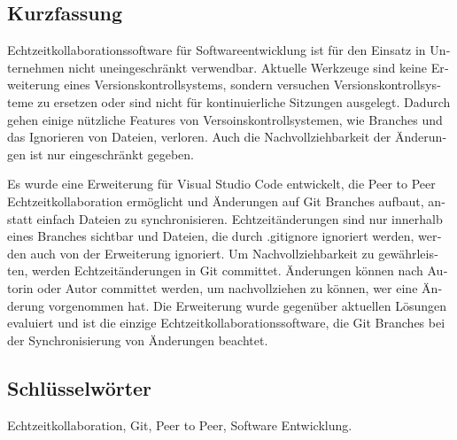 
\cleardoublepage
{}




\begin{otherlanguage}{ngerman}

  \chapter*{Kurzfassung}

  Echtzeitkollaborationssoftware für Softwareentwicklung ist für den Einsatz in Unternehmen nicht uneingeschränkt verwendbar. Aktuelle Werkzeuge sind keine Erweiterung eines Versionskontrollsystems, sondern versuchen Versionskontrollsysteme zu ersetzen oder sind nicht für kontinuierliche Sitzungen ausgelegt. Dadurch gehen einige nützliche Features von Versoinskontrollsystemen, wie Branches und das Ignorieren von Dateien, verloren. Auch die Nachvollziehbarkeit der Änderungen ist nur eingeschränkt gegeben.
  
  Es wurde eine Erweiterung für Visual Studio Code entwickelt, die Peer to Peer Echtzeitkollaboration ermöglicht und Änderungen auf Git Branches aufbaut, anstatt einfach Dateien zu synchronisieren. Echtzeitänderungen sind nur innerhalb eines Branches sichtbar und Dateien, die durch .gitignore ignoriert werden, werden auch von der Erweiterung ignoriert. Um Nachvollziehbarkeit zu gewährleisten, werden Echtzeitänderungen in Git committet. Änderungen können nach Autorin oder Autor committet werden, um nachvollziehen zu können, wer eine Änderung vorgenommen hat. Die Erweiterung wurde gegenüber aktuellen Lösungen evaluiert und ist die einzige Echtzeitkollaborationssoftware, die Git Branches bei der Synchronisierung von Änderungen beachtet.

	

  \bigskip

  \section*{Schl\"usselw\"orter}
  Echtzeitkollaboration, Git, Peer to Peer,  Software Entwicklung.

\end{otherlanguage}

